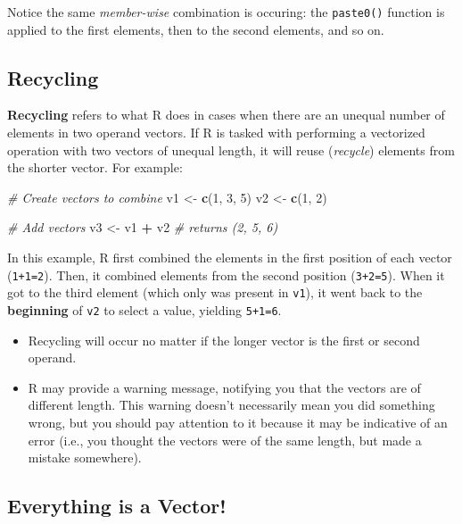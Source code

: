 \documentclass[]{book}
\newenvironment{Shaded}{\begin{snugshade}}{\end{snugshade}}
\newcommand{\KeywordTok}[1]{\textcolor[rgb]{0.13,0.29,0.53}{\textbf{#1}}}
\newcommand{\DecValTok}[1]{\textcolor[rgb]{0.00,0.00,0.81}{#1}}
\newcommand{\StringTok}[1]{\textcolor[rgb]{0.31,0.60,0.02}{#1}}
\newcommand{\CommentTok}[1]{\textcolor[rgb]{0.56,0.35,0.01}{\textit{#1}}}
\newcommand{\OperatorTok}[1]{\textcolor[rgb]{0.81,0.36,0.00}{\textbf{#1}}}
\newcommand{\NormalTok}[1]{#1}
\theoremstyle{definition}
\theoremstyle{definition}
\theoremstyle{remark}
\begin{document}
Notice the same \emph{member-wise} combination is occuring: the
\texttt{paste0()} function is applied to the first elements, then to the
second elements, and so on.

\subsection{Recycling}\label{recycling}

\textbf{Recycling} refers to what R does in cases when there are an
unequal number of elements in two operand vectors. If R is tasked with
performing a vectorized operation with two vectors of unequal length, it
will reuse (\emph{recycle}) elements from the shorter vector. For
example:

\begin{Shaded}
\begin{Highlighting}[]
\CommentTok{# Create vectors to combine}
\NormalTok{v1 <-}\StringTok{ }\KeywordTok{c}\NormalTok{(}\DecValTok{1}\NormalTok{, }\DecValTok{3}\NormalTok{, }\DecValTok{5}\NormalTok{)}
\NormalTok{v2 <-}\StringTok{ }\KeywordTok{c}\NormalTok{(}\DecValTok{1}\NormalTok{, }\DecValTok{2}\NormalTok{)}

\CommentTok{# Add vectors}
\NormalTok{v3 <-}\StringTok{ }\NormalTok{v1 }\OperatorTok{+}\StringTok{ }\NormalTok{v2  }\CommentTok{# returns (2, 5, 6)}
\end{Highlighting}
\end{Shaded}

In this example, R first combined the elements in the first position of
each vector (\texttt{1+1=2}). Then, it combined elements from the second
position (\texttt{3+2=5}). When it got to the third element (which only
was present in \texttt{v1}), it went back to the \textbf{beginning} of
\texttt{v2} to select a value, yielding \texttt{5+1=6}.

\begin{itemize}
\item
  Recycling will occur no matter if the longer vector is the first or
  second operand.
\item
  R may provide a warning message, notifying you that the vectors are of
  different length. This warning doesn't necessarily mean you did
  something wrong, but you should pay attention to it because it may be
  indicative of an error (i.e., you thought the vectors were of the same
  length, but made a mistake somewhere).
\end{itemize}

\subsection{Everything is a Vector!}\label{everything-is-a-vector}
\end{document}
